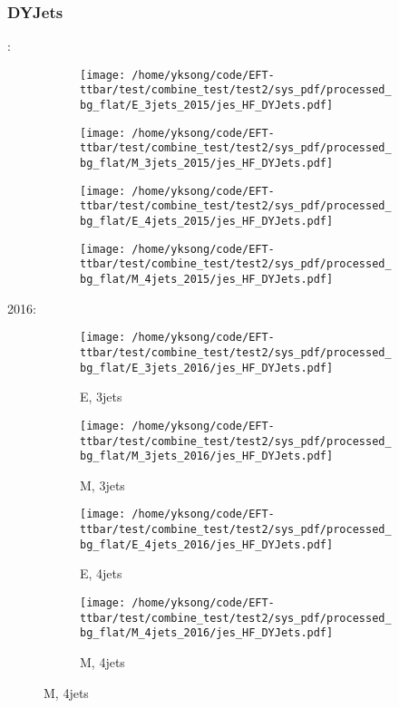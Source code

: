 \documentclass{beamer}
\begin{document}
\begin{frame}
\frametitle{DYJets}
\fontsize{5}{1}:
\begin{figure}
\centering
\begin{subfigure}[b]{0.24\textwidth}
\texttt{[image: /home/yksong/code/EFT-ttbar/test/combine\_test/test2/sys\_pdf/processed\_bg\_flat/E\_3jets\_2015/jes\_HF\_DYJets.pdf]}
\end{subfigure}
\begin{subfigure}[b]{0.24\textwidth}
\texttt{[image: /home/yksong/code/EFT-ttbar/test/combine\_test/test2/sys\_pdf/processed\_bg\_flat/M\_3jets\_2015/jes\_HF\_DYJets.pdf]}
\end{subfigure}
\begin{subfigure}[b]{0.24\textwidth}
\texttt{[image: /home/yksong/code/EFT-ttbar/test/combine\_test/test2/sys\_pdf/processed\_bg\_flat/E\_4jets\_2015/jes\_HF\_DYJets.pdf]}
\end{subfigure}
\begin{subfigure}[b]{0.24\textwidth}
\texttt{[image: /home/yksong/code/EFT-ttbar/test/combine\_test/test2/sys\_pdf/processed\_bg\_flat/M\_4jets\_2015/jes\_HF\_DYJets.pdf]}
\end{subfigure}
\end{figure}
2016:
\begin{figure}
\centering
\begin{subfigure}[b]{0.24\textwidth}
\texttt{[image: /home/yksong/code/EFT-ttbar/test/combine\_test/test2/sys\_pdf/processed\_bg\_flat/E\_3jets\_2016/jes\_HF\_DYJets.pdf]}
\captionsetup{font=tiny}
\caption{E, 3jets}
\end{subfigure}
\begin{subfigure}[b]{0.24\textwidth}
\texttt{[image: /home/yksong/code/EFT-ttbar/test/combine\_test/test2/sys\_pdf/processed\_bg\_flat/M\_3jets\_2016/jes\_HF\_DYJets.pdf]}
\captionsetup{font=tiny}
\caption{M, 3jets}
\end{subfigure}
\begin{subfigure}[b]{0.24\textwidth}
\texttt{[image: /home/yksong/code/EFT-ttbar/test/combine\_test/test2/sys\_pdf/processed\_bg\_flat/E\_4jets\_2016/jes\_HF\_DYJets.pdf]}
\captionsetup{font=tiny}
\caption{E, 4jets}
\end{subfigure}
\begin{subfigure}[b]{0.24\textwidth}
\texttt{[image: /home/yksong/code/EFT-ttbar/test/combine\_test/test2/sys\_pdf/processed\_bg\_flat/M\_4jets\_2016/jes\_HF\_DYJets.pdf]}
\captionsetup{font=tiny}
\caption{M, 4jets}
\end{subfigure}
\end{figure}
\end{frame}
\end{document}
